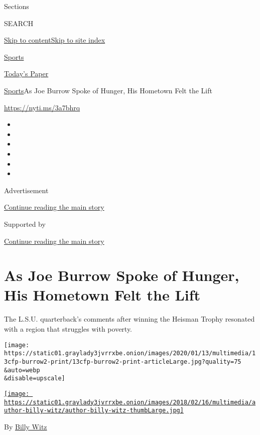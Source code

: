 Sections

SEARCH

\protect\hyperlink{site-content}{Skip to
content}\protect\hyperlink{site-index}{Skip to site index}

\href{https://www.nytimes3xbfgragh.onion/section/sports}{Sports}

\href{https://myaccount.nytimes3xbfgragh.onion/auth/login?response_type=cookie\&client_id=vi}{}

\href{https://www.nytimes3xbfgragh.onion/section/todayspaper}{Today's
Paper}

\href{/section/sports}{Sports}\textbar{}As Joe Burrow Spoke of Hunger,
His Hometown Felt the Lift

\url{https://nyti.ms/3a7bhrq}

\begin{itemize}
\item
\item
\item
\item
\item
\item
\end{itemize}

Advertisement

\protect\hyperlink{after-top}{Continue reading the main story}

Supported by

\protect\hyperlink{after-sponsor}{Continue reading the main story}

\hypertarget{as-joe-burrow-spoke-of-hunger-his-hometown-felt-the-lift}{%
\section{As Joe Burrow Spoke of Hunger, His Hometown Felt the
Lift}\label{as-joe-burrow-spoke-of-hunger-his-hometown-felt-the-lift}}

The L.S.U. quarterback's comments after winning the Heisman Trophy
resonated with a region that struggles with poverty.

\texttt{[image: https://static01.graylady3jvrrxbe.onion/images/2020/01/13/multimedia/13cfp-burrow2-print/13cfp-burrow2-print-articleLarge.jpg?quality=75\\\&auto=webp\\\&disable=upscale]}

\href{https://www.nytimes3xbfgragh.onion/by/billy-witz}{\texttt{[image: https://static01.graylady3jvrrxbe.onion/images/2018/02/16/multimedia/author-billy-witz/author-billy-witz-thumbLarge.jpg]}}

By \href{https://www.nytimes3xbfgragh.onion/by/billy-witz}{Billy Witz}

